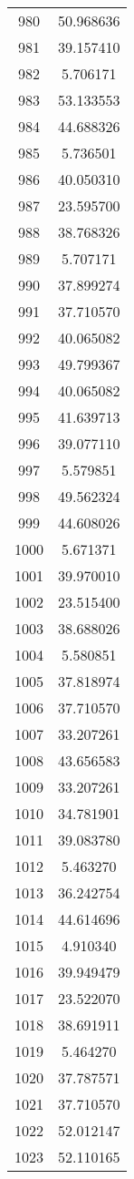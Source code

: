 \documentclass[12pt]{article}
\begin{document}
\begin{longtable}{@{}cc@{}}
980 & 50.968636 \\
981 & 39.157410 \\
982 & 5.706171 \\
983 & 53.133553 \\
984 & 44.688326 \\
985 & 5.736501 \\
986 & 40.050310 \\
987 & 23.595700 \\
988 & 38.768326 \\
989 & 5.707171 \\
990 & 37.899274 \\
991 & 37.710570 \\
992 & 40.065082 \\
993 & 49.799367 \\
994 & 40.065082 \\
995 & 41.639713 \\
996 & 39.077110 \\
997 & 5.579851 \\
998 & 49.562324 \\
999 & 44.608026 \\
1000 & 5.671371 \\
1001 & 39.970010 \\
1002 & 23.515400 \\
1003 & 38.688026 \\
1004 & 5.580851 \\
1005 & 37.818974 \\
1006 & 37.710570 \\
1007 & 33.207261 \\
1008 & 43.656583 \\
1009 & 33.207261 \\
1010 & 34.781901 \\
1011 & 39.083780 \\
1012 & 5.463270 \\
1013 & 36.242754 \\
1014 & 44.614696 \\
1015 & 4.910340 \\
1016 & 39.949479 \\
1017 & 23.522070 \\
1018 & 38.691911 \\
1019 & 5.464270 \\
1020 & 37.787571 \\
1021 & 37.710570 \\
1022 & 52.012147 \\
1023 & 52.110165 \\

\end{longtable}
\end{document}
